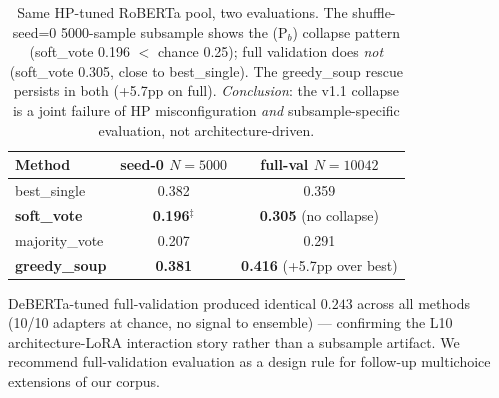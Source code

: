 \documentclass[11pt]{article}
\begin{document}
\begin{table}[h]
\centering
\caption{Same HP-tuned RoBERTa pool, two evaluations. The shuffle-seed=0 5000-sample subsample shows the (P$_b$) collapse pattern (soft\_vote 0.196 $<$ chance 0.25); full validation does \emph{not} (soft\_vote 0.305, close to best\_single). The greedy\_soup rescue persists in both (+5.7pp on full). \emph{Conclusion}: the v1.1 collapse is a joint failure of HP misconfiguration \emph{and} subsample-specific evaluation, not architecture-driven.}
\label{tab:fullval_roberta}
\small
\setlength{\tabcolsep}{4pt}
\begin{tabular}{@{}lcc@{}}
\toprule
Method & seed-0 $N{=}5000$ & full-val $N{=}10042$ \\
\midrule
best\_single   & 0.382 & 0.359 \\
\textbf{soft\_vote}     & \textbf{0.196}$^{\ddagger}$ & \textbf{0.305} (no collapse) \\
majority\_vote & 0.207 & 0.291 \\
\textbf{greedy\_soup}   & \textbf{0.381} & \textbf{0.416} (+5.7pp over best) \\
\bottomrule
\end{tabular}
\end{table}

DeBERTa-tuned full-validation produced identical $0.243$ across all methods (10/10 adapters at chance, no signal to ensemble) --- confirming the L10 architecture-LoRA interaction story rather than a subsample artifact. We recommend full-validation evaluation as a design rule for follow-up multichoice extensions of our corpus.
\end{document}
